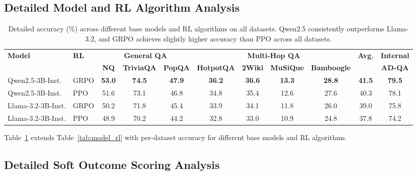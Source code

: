 \documentclass[11pt]{article}
\begin{document}
\subsection{Detailed Model and RL Algorithm Analysis}
\label{sec:appendix_model_rl}

\begin{table}[h]
\centering
\small
\begin{tabular}{ll|ccc|cccc|c|c}
\toprule
\multirow{2}{*}{\textbf{Model}} & \multirow{2}{*}{\textbf{RL}} & \multicolumn{3}{c|}{\textbf{General QA}} & \multicolumn{4}{c|}{\textbf{Multi-Hop QA}} & \multirow{2}{*}{\textbf{Avg.}} & \textbf{Internal} \\
& & \textbf{NQ} & \textbf{TriviaQA} & \textbf{PopQA} & \textbf{HotpotQA} & \textbf{2Wiki} & \textbf{MuSiQue} & \textbf{Bamboogle} & & \textbf{AD-QA} \\
\midrule
Qwen2.5-3B-Inst. & GRPO & \textbf{53.0} & \textbf{74.5} & \textbf{47.9} & \textbf{36.2} & \textbf{36.6} & \textbf{13.3} & \textbf{28.8} & \textbf{41.5} & \textbf{79.5} \\
Qwen2.5-3B-Inst. & PPO & 51.6 & 73.1 & 46.8 & 34.8 & 35.4 & 12.6 & 27.6 & 40.3 & 78.1 \\
Llama-3.2-3B-Inst. & GRPO & 50.2 & 71.8 & 45.4 & 33.9 & 34.1 & 11.8 & 26.0 & 39.0 & 75.8 \\
Llama-3.2-3B-Inst. & PPO & 48.9 & 70.2 & 44.2 & 32.8 & 33.0 & 10.9 & 24.8 & 37.8 & 74.2 \\
\bottomrule
\end{tabular}
\caption{Detailed accuracy (\%) across different base models and RL algorithms on all datasets. Qwen2.5 consistently outperforms Llama-3.2, and GRPO achieves slightly higher accuracy than PPO across all datasets.}
\label{tab:model_rl_detailed}
\end{table}

Table~\ref{tab:model_rl_detailed} extends Table~\ref{tab:model_rl} with per-dataset accuracy for different base models and RL algorithms.

\subsection{Detailed Soft Outcome Scoring Analysis}
\label{sec:appendix_soft_outcome}
\end{document}
